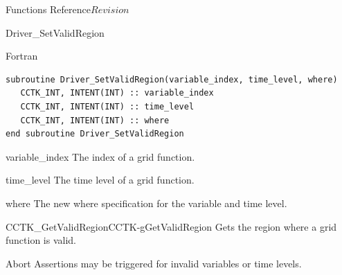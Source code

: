 \begin{cactuspart}{ Functions Reference}{}{$Revision$}
\begin{FunctionDescription}{Driver\_SetValidRegion}
\begin{SynopsisSection}
\begin{Synopsis}{Fortran}
\begin{verbatim}
subroutine Driver_SetValidRegion(variable_index, time_level, where)
   CCTK_INT, INTENT(INT) :: variable_index
   CCTK_INT, INTENT(INT) :: time_level
   CCTK_INT, INTENT(INT) :: where
end subroutine Driver_SetValidRegion

\end{verbatim}
\end{Synopsis}
\end{SynopsisSection}


\begin{ParameterSection}
\begin{Parameter}{variable\_index}
The index of a grid function.
\end{Parameter}

\begin{Parameter}{time\_level}
The time level of a grid function.
\end{Parameter}

\begin{Parameter}{where}
The new where specification for the variable and time level.
\end{Parameter}
\end{ParameterSection}

\begin{SeeAlsoSection}
\begin{SeeAlso2}{CCTK\_GetValidRegion}{CCTK-gGetValidRegion}
Gets the region where a grid function is valid.
\end{SeeAlso2}
\end{SeeAlsoSection}

\begin{ErrorSection}
\begin{Error}{Abort}
Assertions may be triggered for invalid variables or time levels.
\end{Error}
\end{ErrorSection}
\end{FunctionDescription}

\end{cactuspart}
